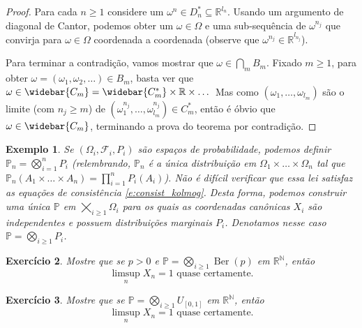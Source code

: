 \documentclass[reqno]{article}
\newcommand*\1{\mathds{1}}
\DeclareMathOperator{\Ber}{Ber}
\newtheorem{example}{Exemplo}[section]
\newtheorem{exercise}[example]{Exercício}
\begin{document}
\begin{proof}
  Para cada $n \geq 1$ considere um $\omega^n \in D_n^* \subseteq \mathbb{R}^{l_n}$.
  Usando um argumento de diagonal de Cantor, podemos obter um $\omega \in \Omega$ e uma sub-sequência de $\omega^{n_j}$ que convirja para $\omega \in \Omega$ coordenada a coordenada (observe que $\omega^{n_j} \in \mathbb{R}^{l_{n_j}}$).

  Para terminar a contradição, vamos mostrar que $\omega \in \bigcap_m B_m$.
  Fixado $m \geq 1$, para obter $\omega = (\omega_1, \omega_2, \dots) \in B_m$, basta ver que $\omega \in \widebar{C_m} = \widebar{C_m^*} \times \mathbb{R} \times \dots$
  Mas como $(\omega_1, \dots, \omega_{l_m})$ são o limite (com $n_j \geq m$) de $(\omega^{n_j}_1, \dots, \omega^{n_j}_{l_m}) \in C_m^*$, então é óbvio que $\omega \in \widebar{C_m}$, terminando a prova do teorema por contradição.
\end{proof}

\begin{example}
  Se $(\Omega_i, \mathcal{F}_i, P_i)$ são espaços de probabilidade, podemos definir $\mathbb{P}_n = \bigotimes_{i=1}^n P_i$ (relembrando, $\mathbb{P}_n$ é a única distribuição em $\Omega_1 \times \dots \times \Omega_n$ tal que $\mathbb{P}_n(A_1 \times \dots \times A_n) = \prod_{i=1}^n P_i(A_i)$).
  Não é difícil verificar que essa lei satisfaz as equações de consistência \eqref{e:consist_kolmog}.
  Desta forma, podemos construir uma única $\mathbb{P}$ em $\bigtimes_{i \geq 1} \Omega_i$ para os quais as coordenadas canônicas $X_i$ são independentes e possuem distribuições marginais $P_i$.
  Denotamos nesse caso $\mathbb{P} = \bigotimes_{i \geq 1} P_i$.
\end{example}

\begin{exercise}
  Mostre que se $p > 0$ e $\mathbb{P} = \bigotimes_{i \geq 1} \Ber(p)$ em $\mathbb{R}^\mathbb{N}$, então
  \begin{equation}
    \text{$\limsup_n X_n = 1$ quase certamente.}
  \end{equation}
\end{exercise}

\begin{exercise}
  Mostre que se $\mathbb{P} = \bigotimes_{i \geq 1} U_{[0,1]}$ em $\mathbb{R}^\mathbb{N}$, então
  \begin{equation}
    \text{$\limsup_n X_n = 1$ quase certamente.}
  \end{equation}
\end{exercise}
\end{document}
